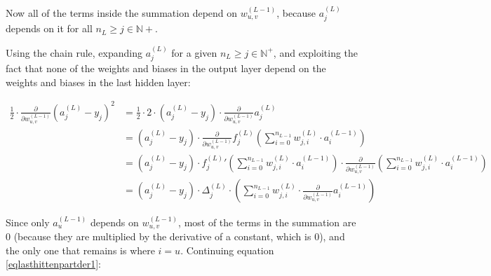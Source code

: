 \documentclass{article}
\begin{document}
          Now all of the terms inside the summation depend on
          $w_{u,v}^{(L-1)}$, because $a_j^{(L)}$ depends on it for
          all $n_L \geq j \in \mathbb{N}+$.

          Using the chain rule, expanding $a_j^{(L)}$ for a given
          $n_L \geq j \in \mathbb{N}^+$, and exploiting the fact that none of
          the weights and biases in the output layer depend on the weights and
          biases in the last hidden layer:

          \begin{equation}\label{eqlasthittenpartder1}
            \begin{split}
              \frac{1}{2}
              \cdot
              \frac{\partial}{\partial w_{u,v}^{(L-1)}}
                \left( a_j^{(L)} - y_j \right)^2
                & = \frac{1}{2}
                    \cdot
                    2
                    \cdot
                    \left( a_j^{(L)} - y_j \right)
                    \cdot
                    \frac{\partial}{\partial w_{u,v}^{(L-1)}}
                      a_j^{(L)} \\
                & = \left( a_j^{(L)} - y_j \right)
                    \cdot
                    \frac{\partial}{\partial w_{u,v}^{(L-1)}}
                      f_j^{(L)} \left(
                        \sum_{i=0}^{n_{L-1}} w_{j,i}^{(L)} \cdot a_i^{(L-1)}
                      \right) \\
                & = \left( a_j^{(L)} - y_j \right)
                    \cdot
                    {f_j^{(L)}}' \left(
                      \sum_{i=0}^{n_{L-1}} w_{j,i}^{(L)} \cdot a_i^{(L-1)}
                    \right)
                    \cdot
                    \frac{\partial}{\partial w_{u,v}^{(L-1)}}
                      \left(
                        \sum_{i=0}^{n_{L-1}} w_{j,i}^{(L)} \cdot a_i^{(L-1)}
                      \right) \\
                & = \left( a_j^{(L)} - y_j \right)
                    \cdot
                    \Delta_j^{(L)}
                    \cdot
                    \left(
                      \sum_{i=0}^{n_{L-1}}
                        w_{j,i}^{(L)}
                        \cdot
                        \frac{\partial}{\partial w_{u,v}^{(L-1)}}
                          a_i^{(L-1)}
                    \right)
            \end{split}
          \end{equation}

          Since only $a_{u}^{(L-1)}$ depends on $w_{u,v}^{(L-1)}$, most of the
          terms in the summation are $0$ (because they are multiplied by the
          derivative of a constant, which is $0$), and the only one that remains
          is where $i = u$. Continuing equation \ref{eqlasthittenpartder1}:
\end{document}
